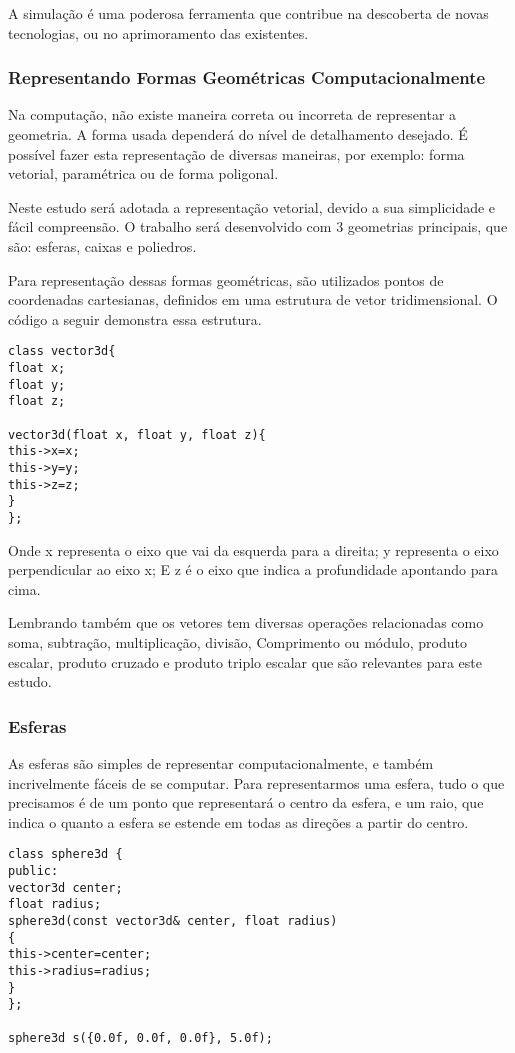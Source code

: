 A simulação é uma poderosa ferramenta que contribue na descoberta de novas
tecnologias, ou no aprimoramento das existentes.


\subsubsection{Representando Formas Geométricas Computacionalmente}
Na computação, não existe maneira correta ou incorreta de representar a
geometria. A forma usada dependerá  do nível de detalhamento desejado. É possível fazer esta representação de diversas maneiras, por exemplo: forma vetorial, paramétrica ou de forma poligonal.

Neste estudo será adotada a representação vetorial, devido a sua simplicidade e fácil compreensão. O trabalho será desenvolvido com 3 geometrias principais, que são: esferas, caixas e poliedros.

Para representação dessas formas geométricas, são utilizados pontos de coordenadas cartesianas, definidos em uma estrutura de vetor tridimensional. O código a seguir demonstra essa estrutura.

\begin{lstlisting}[frame=single,caption=Exemplo de vetor 3d\label{code:vec3d_1}]
class vector3d{
float x;
float y;
float z;

vector3d(float x, float y, float z){
this->x=x;
this->y=y;
this->z=z;
}
};
\end{lstlisting}

Onde x representa o eixo que vai da esquerda para a direita;
y representa o eixo  perpendicular ao eixo x;
E z é o eixo que indica a profundidade apontando para cima.


Lembrando também que os vetores tem diversas operações relacionadas como soma,
subtração, multiplicação, divisão, Comprimento ou módulo, produto escalar,
produto cruzado e produto triplo escalar que são relevantes para este estudo.

\subsubsection{Esferas}

As esferas são simples de representar computacionalmente, e também
incrivelmente fáceis de se computar. Para representarmos uma esfera, tudo o que
precisamos é de um ponto que representará o centro da esfera, e um raio, que
indica o quanto a esfera se estende em todas as direções a partir do centro.

\begin{lstlisting}[frame=single,caption=Representação de esfera\label{code:sphere3d}]
class sphere3d {
public:
vector3d center;
float radius;
sphere3d(const vector3d& center, float radius)
{
this->center=center;
this->radius=radius;
}
};

sphere3d s({0.0f, 0.0f, 0.0f}, 5.0f);
\end{lstlisting}

